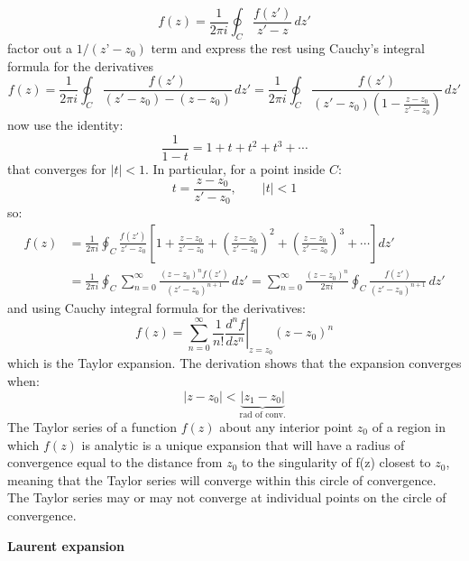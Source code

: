\documentclass{article}
\begin{document}
\newpage
\begin{equation}
    f(z) = \frac{1}{2\pi i} \oint_C \frac{f(z')}{z' - z} \, dz'
\end{equation}
factor out a $1/(z’-z_0)$ term and express the rest using Cauchy’s integral formula for the derivatives
\begin{equation}
    f(z) = \frac{1}{2\pi i} \oint_C \frac{f(z')}{(z' - z_0) - (z - z_0)} \, dz' = \frac{1}{2\pi i} \oint_C \frac{f(z')}{(z' - z_0) \left(1 - \frac{z - z_0}{z' - z_0} \right)} \, dz'
\end{equation}
now use the identity:
\begin{equation}
    \frac{1}{1 - t} = 1 + t + t^2 + t^3 + \cdots
\end{equation}
that converges for $|t|<1$. In particular, for a point inside $C$:
\begin{equation}
    t = \frac{z - z_0}{z' - z_0}, \qquad |t| < 1
\end{equation}
so:
\begin{align}
    f(z) &= \frac{1}{2\pi i} \oint_C \frac{f(z')}{z' - z_0} 
\left[
1 + \frac{z - z_0}{z' - z_0}
+ \left(\frac{z - z_0}{z' - z_0}\right)^2
+ \left(\frac{z - z_0}{z' - z_0}\right)^3 + \cdots
\right] dz'\\
&= \frac{1}{2\pi i} \oint_C \sum_{n=0}^{\infty}
\frac{(z - z_0)^n f(z')}{(z' - z_0)^{n+1}} \, dz'
= \sum_{n=0}^{\infty} \frac{(z - z_0)^n}{2\pi i}
\oint_C \frac{f(z')}{(z' - z_0)^{n+1}} \, dz'
\end{align}
and using Cauchy integral formula for the derivatives:
\begin{equation}
    f(z) = \sum_{n=0}^{\infty} \frac{1}{n!} \left. \frac{d^n f}{dz^n} \right|_{z = z_0} (z - z_0)^n
\end{equation}
which is the Taylor expansion. The derivation shows that the expansion converges when:
\begin{equation}
    |z-z_0| < \underbrace{|z_1 - z_0|}_{\text{rad of conv.}}
\end{equation}
The Taylor series of a function $f(z)$ about any interior point $z_0$ of a region in which $f(z)$ is analytic is a unique expansion that will have a radius of convergence equal to the distance from $z_0$ to the singularity of f(z) closest to $z_0$, meaning that the Taylor series will converge within this circle of convergence. The Taylor series may or may not converge at individual points on the circle of convergence.

\vspace{3mm}\noindent
\textbf{Laurent expansion}
\end{document}
